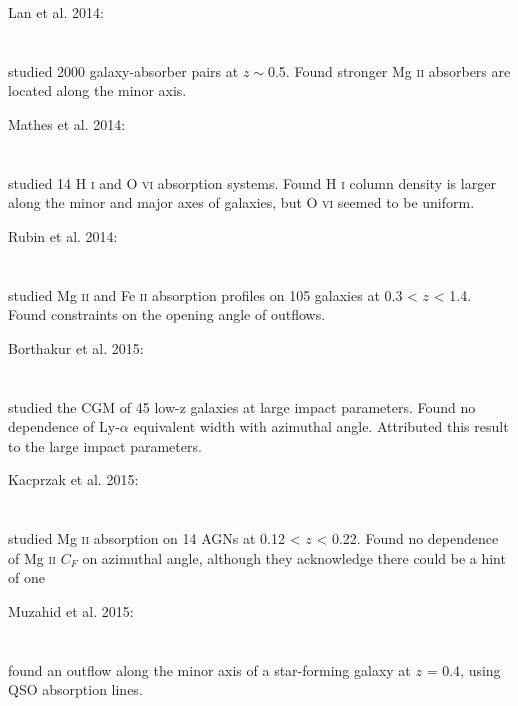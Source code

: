 \hline

Lan et al. 2014: \\
\citet{2014ApJ...795...31L} \\
\citep{2014ApJ...795...31L} \\
studied 2000 galaxy-absorber pairs at $z\sim$0.5. Found stronger
Mg \textsc{ii} absorbers are located along the minor axis. \\

\hline

Mathes et al. 2014: \\
\citet{2014ApJ...792..128M} \\
\citep{2014ApJ...792..128M} \\
studied 14 H \textsc{i} and O \textsc{vi} absorption systems. Found
H \textsc{i} column density is larger along the minor and major axes of
galaxies, but O \textsc{vi} seemed to be uniform. \\

\hline

Rubin et al. 2014: \\
\citet{2014ApJ...794..156R} \\
\citep{2014ApJ...794..156R} \\
studied Mg \textsc{ii} and Fe \textsc{ii} absorption profiles on 105 galaxies at
0.3 < $z$ < 1.4. Found constraints on the opening angle of outflows. \\

\hline

Borthakur et al. 2015: \\
\citet{2015ApJ...813...46B} \\
\citep{2015ApJ...813...46B} \\
studied the CGM of 45 low-z galaxies at large impact parameters. Found no
dependence of Ly-$\alpha$ equivalent width with azimuthal angle. Attributed
this result to the large impact parameters. \\

\hline

Kacprzak et al. 2015: \\
\citet{2015MNRAS.446.2861K} \\
\citep{2015MNRAS.446.2861K} \\
studied Mg \textsc{ii} absorption on 14 AGNs at 0.12 < $z$ < 0.22. Found no
dependence of Mg \textsc{ii} $C_{F}$ on azimuthal angle, although they
acknowledge there could be a hint of one\\

\hline

Muzahid et al. 2015: \\
\citet{2015ApJ...811..132M} \\
\citep{2015ApJ...811..132M} \\
found an outflow along the minor axis of a star-forming galaxy at $z$ = 0.4,
using QSO absorption lines. \\


